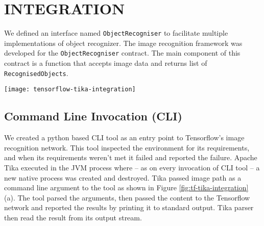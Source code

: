 \section{INTEGRATION} \label{sec:integration}
We defined an interface named \texttt{ObjectRecogniser} to facilitate multiple implementations of object recognizer. The image recognition framework was developed for the \texttt{ObjectRecogniser} contract. The main component of this contract is a function that accepts image data and returns list of \texttt{RecognisedObjects}.


\iffalse %
The following methods of integration were investigated in the order of listing:
\begin{itemize}
\item Command Line Invocation
\item Java Native Interface
\item gRPC Remote Procedure Calls
\item Representational State Transfer API
\end{itemize}
\fi %

\begin{figure*}
	\texttt{[image: tensorflow-tika-integration]}
	\caption{Tika and Tensorflow Integration}
	\label{fig:tf-tika-integration}
\end{figure*}

\subsection{Command Line Invocation (CLI)} \label{sec:int-cli}
We created a python based CLI tool as an entry point to Tensorflow's image recognition network. This tool inspected the environment for its requirements, and when its requirements weren't met it failed and reported the failure. Apache Tika executed in the JVM process where -- as on every invocation of CLI tool -- a new native process was created and destroyed. Tika passed image path as a command line argument to the tool as shown in Figure \ref{fig:tf-tika-integration} (a). The tool parsed the arguments, then passed the content to the Tensorflow network and reported the results by printing it to standard output. Tika parser then read the result from its output stream.

